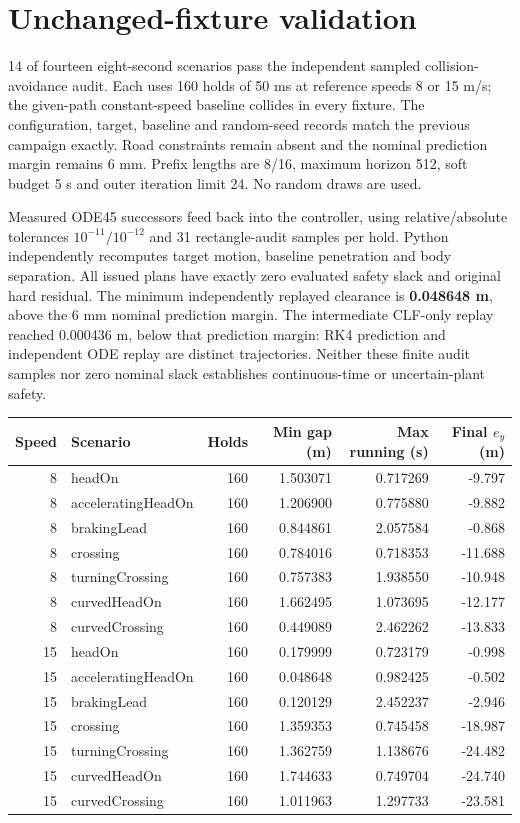 \documentclass[11pt]{article}
\begin{document}
\section{Unchanged-fixture validation}
14 of fourteen eight-second scenarios pass the independent sampled
collision-avoidance audit. Each uses 160 holds of 50 ms at reference speeds
8 or 15 m/s; the given-path constant-speed baseline collides in every fixture.
The configuration, target, baseline and random-seed records match the previous
campaign exactly. Road constraints remain absent and the nominal prediction
margin remains 6 mm. Prefix lengths are 8/16, maximum horizon 512, soft budget
5 s and outer iteration limit 24. No random draws are used.

Measured ODE45 successors feed back into the controller, using relative/absolute
tolerances $10^{-11}/10^{-12}$ and 31 rectangle-audit samples per hold.
Python independently recomputes target motion, baseline penetration and body
separation. All issued plans have exactly zero evaluated safety slack and
original hard residual. The minimum independently replayed clearance is
\textbf{0.048648 m}, above the 6 mm nominal prediction margin. The intermediate CLF-only
replay reached 0.000436 m, below that prediction margin: RK4 prediction and
independent ODE replay are distinct trajectories. Neither
these finite audit samples nor zero nominal slack establishes continuous-time
or uncertain-plant safety.

\begin{center}\small
\begin{tabular}{rlrrrr}
\toprule
Speed & Scenario & Holds & Min gap (m) & Max running (s) & Final $e_y$ (m)\\
\midrule
8 & headOn & 160 & 1.503071 & 0.717269 & -9.797 \\
8 & acceleratingHeadOn & 160 & 1.206900 & 0.775880 & -9.882 \\
8 & brakingLead & 160 & 0.844861 & 2.057584 & -0.868 \\
8 & crossing & 160 & 0.784016 & 0.718353 & -11.688 \\
8 & turningCrossing & 160 & 0.757383 & 1.938550 & -10.948 \\
8 & curvedHeadOn & 160 & 1.662495 & 1.073695 & -12.177 \\
8 & curvedCrossing & 160 & 0.449089 & 2.462262 & -13.833 \\
15 & headOn & 160 & 0.179999 & 0.723179 & -0.998 \\
15 & acceleratingHeadOn & 160 & 0.048648 & 0.982425 & -0.502 \\
15 & brakingLead & 160 & 0.120129 & 2.452237 & -2.946 \\
15 & crossing & 160 & 1.359353 & 0.745458 & -18.987 \\
15 & turningCrossing & 160 & 1.362759 & 1.138676 & -24.482 \\
15 & curvedHeadOn & 160 & 1.744633 & 0.749704 & -24.740 \\
15 & curvedCrossing & 160 & 1.011963 & 1.297733 & -23.581 \\
\bottomrule
\end{tabular}
\end{center}
\end{document}

